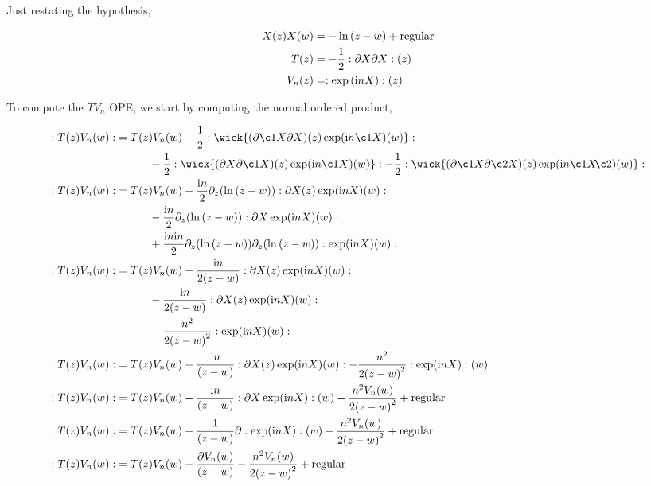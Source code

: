 \problem{}
\probitem{}

Just restating the hypothesis,

\begin{align*}
    X\qty(z)X\qty(w)&=-\ln\qty(z-w)+\textnormal{regular}\\
    T\qty(z)&=-\frac12:\partial X\partial X:\qty(z)\\
    V_n\qty(z)&=:\exp\qty(\textnormal{i} n X):\qty(z)
\end{align*}

To compute the $TV_n$ OPE, we start by computing the normal ordered product,

\begin{align*}
    \cnord{T\qty(z)V_n\qty(w)}&=T\qty(z)V_n\qty(w)-\frac12\cnord{\wick{(\partial \c1X\partial X)\qty(z)\exp(\im n \c1X)\qty(w)}}\\
    &\quad\quad\quad-\frac12\cnord{\wick{(\partial X\partial \c1X)\qty(z)\exp(\im n \c1X)\qty(w)}}-\frac12\cnord{\wick{(\partial \c1X\partial\c2 X)\qty(z)\exp(\im n \c1 X\mkern-4mu \c2 {\mathclap{\phantom{X}}})\qty(w)}}\\
    \cnord{T\qty(z)V_n\qty(w)}&=T\qty(z)V_n\qty(w)-\frac{\im n}{2}\partial_z\qty(\ln\qty(z-w))\cnord{\partial X\qty(z)\exp(\im n X)\qty(w)}\\
    &\quad\quad\quad-\frac{\im n}{2}\partial_z\qty(\ln\qty(z-w))\cnord{\partial X\exp(\im n X)\qty(w)}\\
    &\quad\quad\quad+\frac{\im n \im n}{2}\partial_z\qty(\ln\qty(z-w))\partial_z\qty(\ln\qty(z-w))\cnord{\exp(\im n X)\qty(w)}\\
    \cnord{T\qty(z)V_n\qty(w)}&=T\qty(z)V_n\qty(w)-\frac{\im n}{2\qty(z-w)}\cnord{\partial X\qty(z)\exp(\im n X)\qty(w)}\\
    &\quad\quad\quad-\frac{\im n}{2\qty(z-w)}\cnord{\partial X\qty(z)\exp(\im n X)\qty(w)}\\
    &\quad\quad\quad-\frac{n^2}{2\qty(z-w)^2}\cnord{\exp(\im n X)\qty(w)}\\
    \cnord{T\qty(z)V_n\qty(w)}&=T\qty(z)V_n\qty(w)-\frac{\im n}{\qty(z-w)}\cnord{\partial X\qty(z)\exp(\im n X)\qty(w)}-\frac{n^2}{2\qty(z-w)^2}\cnord{\exp(\im n X)}\qty(w)\\
    \cnord{T\qty(z)V_n\qty(w)}&=T\qty(z)V_n\qty(w)-\frac{\im n}{\qty(z-w)}\cnord{\partial X\exp(\im n X)}\qty(w)-\frac{n^2V_n\qty(w)}{2\qty(z-w)^2}+\textnormal{regular}\\
    \cnord{T\qty(z)V_n\qty(w)}&=T\qty(z)V_n\qty(w)-\frac{1}{\qty(z-w)}\partial\cnord{\exp(\im n X)}\qty(w)-\frac{n^2V_n\qty(w)}{2\qty(z-w)^2}+\textnormal{regular}\\
    \cnord{T\qty(z)V_n\qty(w)}&=T\qty(z)V_n\qty(w)-\frac{\partial V_n\qty(w)}{\qty(z-w)}-\frac{n^2V_n\qty(w)}{2\qty(z-w)^2}+\textnormal{regular}
\end{align*}

